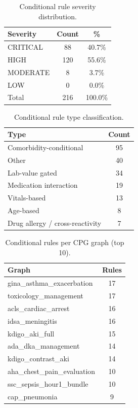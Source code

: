 \begin{table}[h]
\centering
\caption{Conditional rule severity distribution.}
\label{tab:rule_severity}
\begin{tabular}{lcc}
\toprule
\textbf{Severity} & \textbf{Count} & \textbf{\%} \\
\midrule
CRITICAL & 88 & 40.7\% \\
HIGH & 120 & 55.6\% \\
MODERATE & 8 & 3.7\% \\
LOW & 0 & 0.0\% \\
\midrule
Total & 216 & 100.0\% \\
\bottomrule
\end{tabular}
\end{table}

\begin{table}[h]
\centering
\caption{Conditional rule type classification.}
\label{tab:rule_types}
\begin{tabular}{lc}
\toprule
\textbf{Type} & \textbf{Count} \\
\midrule
Comorbidity-conditional & 95 \\
Other & 40 \\
Lab-value gated & 34 \\
Medication interaction & 19 \\
Vitals-based & 13 \\
Age-based & 8 \\
Drug allergy / cross-reactivity & 7 \\
\bottomrule
\end{tabular}
\end{table}

\begin{table}[h]
\centering
\caption{Conditional rules per CPG graph (top 10).}
\label{tab:graph_density}
\begin{tabular}{lc}
\toprule
\textbf{Graph} & \textbf{Rules} \\
\midrule
gina\_asthma\_exacerbation & 17 \\
toxicology\_management & 17 \\
acls\_cardiac\_arrest & 16 \\
idsa\_meningitis & 16 \\
kdigo\_aki\_full & 15 \\
ada\_dka\_management & 14 \\
kdigo\_contrast\_aki & 14 \\
aha\_chest\_pain\_evaluation & 10 \\
ssc\_sepsis\_hour1\_bundle & 10 \\
cap\_pneumonia & 9 \\
\bottomrule
\end{tabular}
\end{table}

